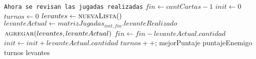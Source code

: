 \documentclass[11pt, a4paper, twoside]{article}
\begin{document}
\begin{algorithm}[H]
\begin{algorithmic}
	\Statex \texttt{Ahora se revisan las jugadas realizadas}
	\State $fin \gets cantCartas -1$										
	\State $init \gets 0$													
	\State $turnos \gets 0$													
	\State $ levantes \gets \Call{nuevaLista}$								
														
		\State $levanteActual \gets matrizJugadas_{init,fin}.levanteRealizado$	
		\State $\Call{agregar}{levantes, levanteActual}$						
							
			\State $fin \gets fin - levanteActual.cantidad $					
		\Else
			\State $init \gets init + levanteActual.cantidad $					
		\EndIf
		\State $turnos++$;														
	\EndWhile
	\State \Return mejorPuntaje													
	\State \Return puntajeEnemigo												
	\State \Return turnos														
	\State \Return levantes														
\end{algorithmic}
\end{algorithm}
\end{document}
